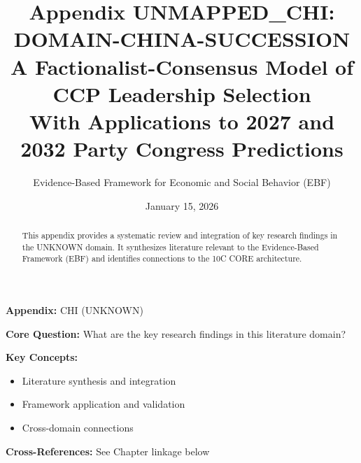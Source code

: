 \documentclass[11pt]{article}
\title{\textbf{Appendix UNMAPPED_CHI: DOMAIN-CHINA-SUCCESSION} \\ A Factionalist-Consensus Model of CCP Leadership Selection \\ With Applications to 2027 and 2032 Party Congress Predictions}
\author{Evidence-Based Framework for Economic and Social Behavior (EBF)}
\date{January 15, 2026}
\begin{document}
\maketitle


\begin{tcolorbox}[colback=blue!5!white, colframe=blue!75!black,
    title=Quick Reference: Appendix UNMAPPED_CHI]
\textbf{Appendix:} CHI (UNKNOWN)

\textbf{Core Question:} What are the key research findings in this literature domain?

\textbf{Key Concepts:}
\begin{itemize}[nosep]
\item Literature synthesis and integration
\item Framework application and validation
\item Cross-domain connections
\end{itemize}

\textbf{Cross-References:} See Chapter linkage below
\end{tcolorbox}


\begin{abstract}
This appendix provides a systematic review and integration of key research findings
in the UNKNOWN domain. It synthesizes literature relevant to the Evidence-Based
Framework (EBF) and identifies connections to the 10C CORE architecture.
\end{abstract}
\end{document}
